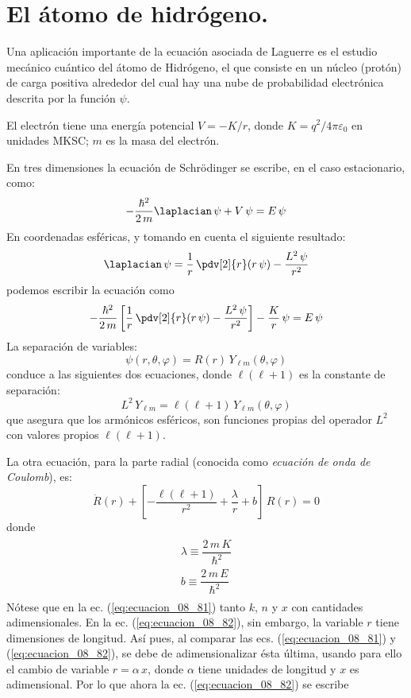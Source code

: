 \section{El átomo de hidrógeno.}
Una aplicación importante de la ecuación asociada de Laguerre es el estudio mecánico cuántico del átomo de Hidrógeno, el que consiste en un núcleo (protón) de
carga positiva alrededor del cual hay una nube de probabilidad electrónica descrita por la función $\psi$.
\par
El electrón tiene una energía potencial $V = -K /r$, donde $K = q^{2} / 4 \pi \varepsilon_{0}$ en unidades MKSC; $m$ es la masa del electrón.
\par
En tres dimensiones la ecuación de Schrödinger se escribe, en el caso estacionario, como:
\[ - \dfrac{\hbar^{2}}{2 \, m} \laplacian \, \psi + V \, \psi = E \, \psi \]
En coordenadas esféricas, y tomando en cuenta el siguiente resultado:
\[ \laplacian \, \psi = \dfrac{1}{r} \, \pdv[2]{r} (r \, \psi) - \dfrac{L^{2} \, \psi}{r^{2}} \]
podemos escribir la ecuación como
\[ - \dfrac{\hbar^{2}}{2 \, m} \left[ \dfrac{1}{r} \, \pdv[2]{r} (r \, \psi) - \dfrac{L^{2} \, \psi}{r^{2}} \right] - \dfrac{K}{r} \, \psi = E \, \psi \]
La separación de variables:
\[ \psi (r, \theta, \varphi) = R(r) \, Y_{\ell m} (\theta, \varphi) \]
conduce a las siguientes dos ecuaciones, donde $\ell (\ell +1)$ es la constante de separación:
\[  L^{2} \, Y_{\ell m} = \ell (\ell + 1) \, Y_{\ell m} (\theta, \varphi) \]
que asegura que los armónicos esféricos, son funciones propias del operador $L^{2}$ con valores propios $\ell (\ell +1)$.
\par
La otra ecuación, para la parte radial (conocida como \emph{ecuación de onda de Coulomb}), es:
\begin{equation}
\ddot{R} (r) + \left[ - \dfrac{\ell (\ell + 1)}{r^{2}} + \dfrac{\lambda}{r} + b \right] \, R (r) = 0
\label{eq:ecuacion_08_82}
\end{equation}
donde
\begin{align}
\begin{aligned}
\lambda \equiv \dfrac{2 \, m \, K}{\hbar^{2}} \\
b \equiv \dfrac{2 \, m \, E}{\hbar^{2}}
 \end{aligned}
\label{eq:ecuacion_08_83}
\end{align}
Nótese que en la ec. (\ref{eq:ecuacion_08_81}) tanto $k$, $n$ y $x$ con cantidades adimensionales. En la ec. (\ref{eq:ecuacion_08_82}), sin embargo, la variable $r$ tiene dimensiones de longitud. Así pues, al comparar las ecs. (\ref{eq:ecuacion_08_81}) y (\ref{eq:ecuacion_08_82}), se debe de adimensionalizar ésta última, usando para ello el cambio de variable $r = \alpha \, x$, donde $\alpha$ tiene unidades de longitud y $x$ es adimensional. Por lo que ahora la ec. (\ref{eq:ecuacion_08_82}) se escribe
